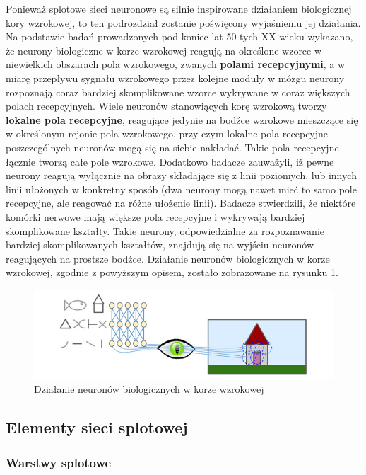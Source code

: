 \documentclass[12pt]{mwbk}
\theoremstyle{plain}
\theoremstyle{definition}
\theoremstyle{remark}
\newcommand\zrodlo[1]{\par\vspace{-3mm}{\small\textit{Źródło: }#1 }}
\begin{document}
Ponieważ splotowe sieci neuronowe są silnie inspirowane działaniem biologicznej kory wzrokowej, to ten podrozdział zostanie poświęcony wyjaśnieniu jej działania. Na podstawie badań prowadzonych pod koniec lat 50-tych XX wieku \cite{hubel1} \cite{hubel2} wykazano, że neurony biologiczne w korze wzrokowej reagują na określone wzorce w niewielkich obszarach pola wzrokowego, zwanych \textbf{polami recepcyjnymi}, a w miarę przepływu sygnału wzrokowego przez kolejne moduły w mózgu neurony rozpoznają coraz bardziej skomplikowane wzorce wykrywane w coraz większych polach recepcyjnych.
Wiele neuronów stanowiących korę wzrokową tworzy \textbf{lokalne pola recepcyjne}, reagujące jedynie na bodźce wzrokowe mieszczące się w określonym rejonie pola wzrokowego, przy czym lokalne pola recepcyjne poszczególnych neuronów mogą się na siebie nakładać. Takie pola recepcyjne łącznie tworzą całe pole wzrokowe. Dodatkowo badacze zauważyli, iż pewne neurony reagują wyłącznie na obrazy składające się z linii poziomych, lub innych linii ułożonych w konkretny sposób (dwa neurony mogą nawet mieć to samo pole recepcyjne, ale reagować na różne ułożenie linii). Badacze stwierdzili, że niektóre komórki nerwowe mają większe pola recepcyjne i wykrywają bardziej skomplikowane kształty. Takie neurony, odpowiedzialne za rozpoznawanie bardziej skomplikowanych kształtów, znajdują się na wyjściu neuronów reagujących na prostsze bodźce. Działanie neuronów biologicznych w korze wzrokowej, zgodnie z powyższym opisem, zostało zobrazowane na rysunku \ref{fig:kora-wzrokowa}.


\begin{figure}[!h]
	\centering
	\includegraphics[width=\linewidth]{rys/kora_wzrokowa.png}
	\caption{Działanie neuronów biologicznych w korze wzrokowej}
	\zrodlo{\cite{geron}}
	\label{fig:kora-wzrokowa}
\end{figure}

\subsection{Elementy sieci splotowej}

\subsubsection{Warstwy splotowe}
\end{document}
